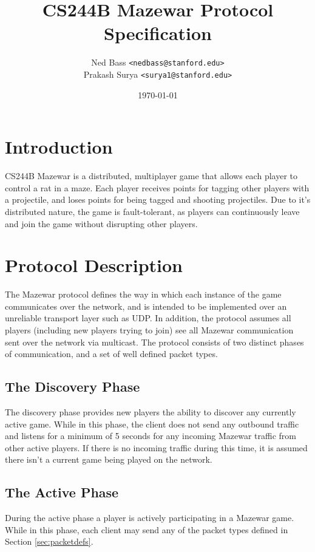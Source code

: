 \documentclass{article}
\title{CS244B Mazewar Protocol Specification}
\author{Ned Bass      \texttt{<nedbass@stanford.edu>} \\
        Prakash Surya \texttt{<surya1@stanford.edu>}}
\date{\today}
\begin{document}
\maketitle

\section{Introduction}
CS244B Mazewar is a distributed, multiplayer game that allows each
player to control a rat in a maze. Each player receives points for
tagging other players with a projectile, and loses points for being
tagged and shooting projectiles. Due to it's distributed nature, the
game is fault-tolerant, as players can continuously leave and join the
game without disrupting other players.

\section{Protocol Description}
The Mazewar protocol defines the way in which each instance of the game
communicates over the network, and is intended to be implemented over an
unreliable transport layer such as UDP. In addition, the protocol
assumes all players (including new players trying to join) see all
Mazewar communication sent over the network via multicast. The protocol
consists of two distinct phases of communication, and a set of well
defined packet types.

\subsection{The Discovery Phase}
\label{ssec:discovery}
The discovery phase provides new players the ability to discover any
currently active game.  While in this phase, the client does not send
any outbound traffic and listens for a minimum of 5 seconds for any
incoming Mazewar traffic from other active players. If there is no
incoming traffic during this time, it is assumed there isn't a current
game being played on the network.

\subsection{The Active Phase}
During the active phase a player is actively participating in a Mazewar
game. While in this phase, each client may send any of the packet types
defined in Section \ref{sec:packetdefs}.
\end{document}
